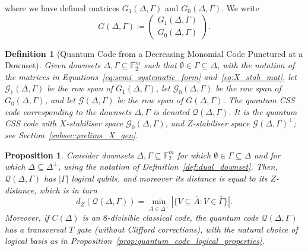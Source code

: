 \documentclass{article}
\newcounter{main}[section]
\newtheorem{definition}[main]{Definition}
\newtheorem{proposition}[main]{Proposition}
\begin{document}
where we have defined matrices $G_1(\Delta, \Gamma)$ and $G_0(\Delta, \Gamma)$. We write
\begin{equation}
    G(\Delta, \Gamma) \coloneq \begin{pmatrix}
        G_1(\Delta, \Gamma)\\
        G_0(\Delta, \Gamma)
    \end{pmatrix}.
\end{equation}
\begin{definition}[Quantum Code from a Decreasing Monomial Code Punctured at a Downset]
    Given downsets $\Delta, \Gamma \subseteq \mathbb{F}_2^m$ such that $\emptyset \in \Gamma \subseteq \Delta$, with the notation of the matrices in Equations~\eqref{eq:semi_systematic_form} and~\eqref{eq:X_stab_mat}, let $\mathcal{G}_1(\Delta, \Gamma)$ be the row span of $G_1(\Delta, \Gamma)$, let $\mathcal{G}_0(\Delta, \Gamma)$ be the row span of $G_0(\Delta, \Gamma)$, and let $\mathcal{G}(\Delta, \Gamma)$ be the row span of $G(\Delta, \Gamma)$. The quantum CSS code corresponding to the downsets $\Delta, \Gamma$ is denoted $\mathcal{Q}(\Delta, \Gamma)$. It is the quantum CSS code with $X$-stabiliser space $\mathcal{G}_0(\Delta, \Gamma)$, and $Z$-stabiliser space $\mathcal{G}(\Delta, \Gamma)^\perp$; see Section~\ref{subsec:prelims_X_gen}.
\end{definition}
\begin{proposition}\label{prop:downsets_to_quantum_code}
    Consider downsets $\Delta, \Gamma \subseteq \mathbb{F}_2^m$ for which $\emptyset \in \Gamma \subseteq \Delta$ and for which $\Delta \subseteq \Delta^\perp$, using the notation of Definition~\ref{def:dual_downset}. Then, $\mathcal{Q}(\Delta, \Gamma)$ has $|\Gamma|$ logical qubits, and moreover its distance is equal to its $Z$-distance, which is in turn
    \begin{equation}\label{eq:quantum_code_distance}
        d_Z(\mathcal{Q}(\Delta, \Gamma)) = \min_{A \in \Delta^\perp}|\{V \subseteq \bar{A}:V \in \bar{\Gamma}\}|.
    \end{equation}
    Moreover, if $C(\Delta)$ is an $8$-divisible classical code, the quantum code $\mathcal{Q}(\Delta, \Gamma)$ has a transversal $T$ gate (without Clifford corrections), with the natural choice of logical basis as in Proposition~\ref{prop:quantum_code_logical_properties}.
\end{proposition}
\end{document}
